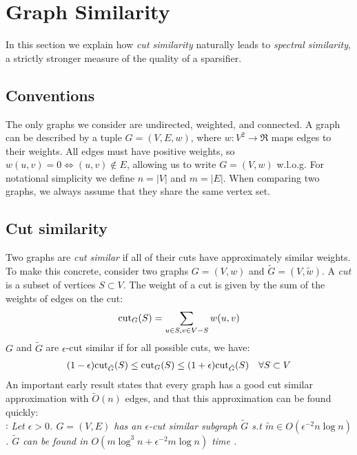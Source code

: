 \documentclass{article}
\begin{document}
\section{Graph Similarity}

In this section we explain how \textit{cut similarity} naturally leads to
\textit{spectral similarity}, a strictly stronger measure of the quality of
a sparsifier.

\subsection{Conventions}

The only graphs we consider are undirected, weighted, and connected. A graph
can be described by a tuple $G = (V, E, w)$, where $w : V^2 \rightarrow \Re$
maps edges to their weights. All edges must have positive weights, so $w(u,
v) = 0 \Leftrightarrow (u, v) \not\in E$, allowing us to write $G = (V, w)$
w.l.o.g. For notational simplicity we define $n = |V|$ and $m = |E|$. When
comparing two graphs, we always assume that they share the same vertex set.

\subsection{Cut similarity}

Two graphs are \textit{cut similar} if all of their cuts have approximately
similar weights. To make this concrete, consider two graphs $G = (V, w)$ and
$\tilde{G} = (V, \tilde{w})$. A \textit{cut} is a subset of vertices $S
\subset V$.  The weight of a cut is given by the sum of the weights of edges
on the cut:
\begin{align*}
    \text{cut}_{G}(S) = \sum_{u \in S, v \in V - S} w(u, v)
\end{align*}
$G$ and $\tilde{G}$ are $\epsilon$-cut similar if for all possible cuts, we
have:
\begin{align*}
    (1 - \epsilon)\text{cut}_{\tilde{G}}(S) \leq \text{cut}_{G}(S) \leq (1 +
    \epsilon)\text{cut}_{\tilde{G}}(S) \quad \forall{S \subset V}
\end{align*}
An important early result states that every graph has a good cut similar
approximation with $\tilde{O}(n)$ edges, and that this approximation can be
found quickly: \\

\noindent
{}: \textit{Let $\epsilon > 0$. $G =
(V, E)$ has an $\epsilon$-cut similar subgraph $\tilde{G}$ s.t $\tilde{m}
\in O(\epsilon^{-2}n\log n)$. $\tilde{G}$ can be found in $O(m\log^3n +
\epsilon^{-2}m\log n)$ time \cite{BenczurKarger}.} \\
\end{document}
